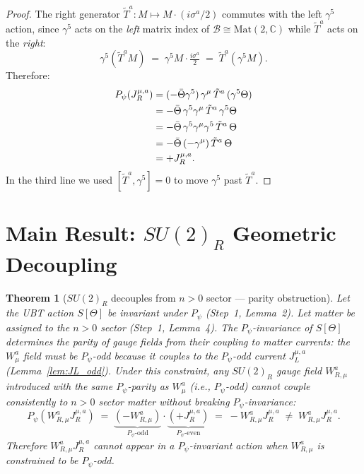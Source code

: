 \documentclass[12pt,a4paper]{article}
\newtheorem{theorem}{Theorem}[section]
\theoremstyle{definition}
\theoremstyle{remark}
\begin{document}
\begin{proof}
The right generator $\tilde{T}^a: M\mapsto M\cdot(i\sigma^a/2)$ commutes with
the left $\gamma^5$ action, since $\gamma^5$ acts on the \emph{left} matrix index
of $\mathcal{B}\cong\mathrm{Mat}(2,\mathbb{C})$ while $\tilde{T}^a$ acts on the \emph{right}:
\begin{equation}
  \gamma^5\!\left(\tilde{T}^a M\right)
  \;=\;
  \gamma^5 M \cdot \tfrac{i\sigma^a}{2}
  \;=\;
  \tilde{T}^a(\gamma^5 M).
\end{equation}
Therefore:
\begin{align}
  P_\psi(J^{\mu,a}_R)
  &= (-\bar\Theta\gamma^5)\,\gamma^\mu\,\tilde{T}^a\,(\gamma^5\Theta) \notag\\
  &= -\bar\Theta\,\gamma^5\gamma^\mu\,\tilde{T}^a\,\gamma^5\Theta \notag\\
  &= -\bar\Theta\,\gamma^5\gamma^\mu\gamma^5\,\tilde{T}^a\,\Theta \notag\\
  &= -\bar\Theta\,(-\gamma^\mu)\,\tilde{T}^a\,\Theta \notag\\
  &= +J^{\mu,a}_R.
\end{align}
In the third line we used $[\tilde{T}^a,\gamma^5]=0$ to move $\gamma^5$ past $\tilde{T}^a$.
\end{proof}

\section{Main Result: $SU(2)_R$ Geometric Decoupling}
\label{sec:main}

\begin{theorem}[$SU(2)_R$ decouples from $n>0$ sector — parity obstruction]
\label{thm:wr_decoupling}
Let the UBT action $S[\Theta]$ be invariant under $P_\psi$ (Step~1, Lemma~2).
Let matter be assigned to the $n>0$ sector (Step~1, Lemma~4).
The $P_\psi$-invariance of $S[\Theta]$ determines the parity of gauge fields
from their coupling to matter currents: the $W_\mu^a$ field must be $P_\psi$-odd
because it couples to the $P_\psi$-odd current $J^{\mu,a}_L$ (Lemma~\ref{lem:JL_odd}).
Under this constraint, any $SU(2)_R$ gauge field $W_{R,\mu}^a$ introduced with
the \emph{same} $P_\psi$-parity as $W_\mu^a$ (i.e., $P_\psi$-odd) cannot couple
consistently to $n>0$ sector matter without breaking $P_\psi$-invariance:
\begin{equation}
  P_\psi\!\left(W_{R,\mu}^a J^{\mu,a}_R\right)
  \;=\;
  \underbrace{(-W_{R,\mu}^a)}_{P_\psi\text{-odd}}
  \cdot\underbrace{(+J^{\mu,a}_R)}_{P_\psi\text{-even}}
  \;=\;
  -W_{R,\mu}^a J^{\mu,a}_R
  \;\neq\;
  W_{R,\mu}^a J^{\mu,a}_R.
\end{equation}
Therefore $W_{R,\mu}^a J^{\mu,a}_R$ cannot appear in a $P_\psi$-invariant action
when $W_{R,\mu}^a$ is constrained to be $P_\psi$-odd.
\end{theorem}
\end{document}
